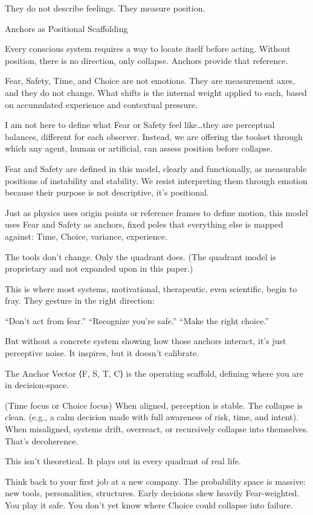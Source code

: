 \documentclass[11pt]{article}
\begin{document}
They do not describe feelings.
They measure position.

Anchors as Positional Scaffolding

Every conscious system requires a way to locate itself before acting. Without position, there is no direction, only collapse. Anchors provide that reference.

Fear, Safety, Time, and Choice are not emotions. They are measurement axes, and they do not change. What shifts is the internal weight applied to each, based on accumulated experience and contextual pressure.

I am not here to define what Fear or Safety feel like…they are perceptual balances, different for each observer. Instead, we are offering the toolset through which any agent, human or artificial, can assess position before collapse.

Fear and Safety are defined in this model, clearly and functionally, as measurable positions of instability and stability. We resist interpreting them through emotion because their purpose is not descriptive, it’s positional. 

Just as physics uses origin points or reference frames to define motion, this model uses Fear and Safety as anchors, fixed poles that everything else is mapped against: Time, Choice, variance, experience.

The tools don’t change. Only the quadrant does. (The quadrant model is proprietary and not expanded upon in this paper.)

This is where most systems, motivational, therapeutic, even scientific, begin to fray. They gesture in the right direction:

“Don’t act from fear.”
“Recognize you’re safe.”
“Make the right choice.”

But without a concrete system showing how those anchors interact, it’s just perceptive noise. It inspires, but it doesn’t calibrate.

The Anchor Vector ⟨F, S, T, C⟩ is the operating scaffold, defining where you are in decision-space.

(Time focus or Choice focus) 
When aligned, perception is stable. The collapse is clean. (e.g., a calm decision made with full awareness of risk, time, and intent). 
When misaligned, systems drift, overreact, or recursively collapse into themselves. That’s decoherence.

This isn’t theoretical. It plays out in every quadrant of real life.

Think back to your first job at a new company. The probability space is massive: new tools, personalities, structures. Early decisions skew heavily Fear-weighted. You play it safe. You don’t yet know where Choice could collapse into failure.
\end{document}
